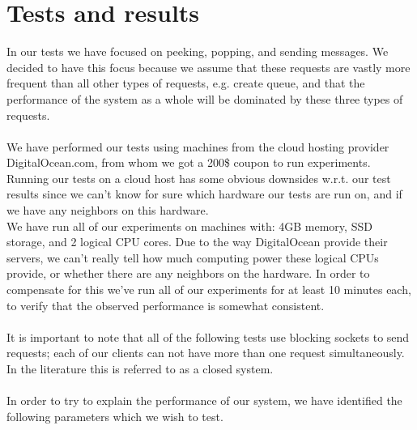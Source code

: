 \documentclass{article}
\begin{document}
    \section{Tests and results}
        \label{sec:tests_and_results}
        In our tests we have focused on peeking, popping, and sending messages. We decided to have this focus because we assume that these requests are vastly more frequent than all other types of requests, e.g. create queue, and that the performance of the system as a whole will be dominated by these three types of requests.\\
        \\
        We have performed our tests using machines from the cloud hosting provider DigitalOcean.com, from whom we got a 200\$ coupon to run experiments. Running our tests on a cloud host has some obvious downsides w.r.t. our test results since we can't know for sure which hardware our tests are run on, and if we have any neighbors on this hardware.\\
        We have run all of our experiments on machines with: 4GB memory, SSD storage, and 2 logical CPU cores. Due to the way DigitalOcean provide their servers, we can't really tell how much computing power these logical CPUs provide, or whether there are any neighbors on the hardware. In order to compensate for this we've run all of our experiments for at least 10 minutes each, to verify that the observed performance is somewhat consistent.\\
        \\
        It is important to note that all of the following tests use blocking sockets to send requests; each of our clients can not have more than one request simultaneously. In the literature this is referred to as a closed system.\\
        \\
        In order to try to explain the performance of our system, we have identified the following parameters which we wish to test.
\end{document}
